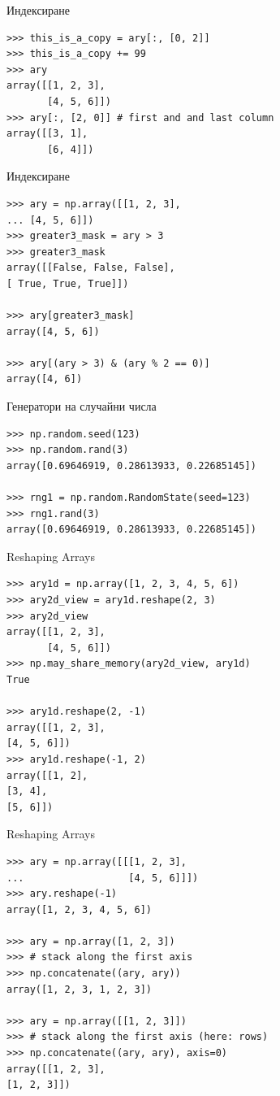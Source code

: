 \documentclass{beamer}
\begin{document}
\begin{frame}[fragile]{Индексиране }
\begin{verbatim}
>>> this_is_a_copy = ary[:, [0, 2]]
>>> this_is_a_copy += 99
>>> ary
array([[1, 2, 3],
       [4, 5, 6]])
>>> ary[:, [2, 0]] # first and and last column
array([[3, 1],
       [6, 4]])
\end{verbatim}
\end{frame}

\begin{frame}[fragile]{Индексиране }
\begin{verbatim}
>>> ary = np.array([[1, 2, 3],
... [4, 5, 6]])
>>> greater3_mask = ary > 3
>>> greater3_mask
array([[False, False, False],
[ True, True, True]])

>>> ary[greater3_mask]
array([4, 5, 6])

>>> ary[(ary > 3) & (ary % 2 == 0)]
array([4, 6])
\end{verbatim}
\end{frame}

\begin{frame}[fragile]{Генератори на случайни числа}
\begin{verbatim}
>>> np.random.seed(123)
>>> np.random.rand(3)
array([0.69646919, 0.28613933, 0.22685145])

>>> rng1 = np.random.RandomState(seed=123)
>>> rng1.rand(3)
array([0.69646919, 0.28613933, 0.22685145])
\end{verbatim}
\end{frame}

\begin{frame}[fragile]{Reshaping Arrays}
\begin{verbatim}
>>> ary1d = np.array([1, 2, 3, 4, 5, 6])
>>> ary2d_view = ary1d.reshape(2, 3)
>>> ary2d_view
array([[1, 2, 3],
       [4, 5, 6]])
>>> np.may_share_memory(ary2d_view, ary1d)
True

>>> ary1d.reshape(2, -1)
array([[1, 2, 3],
[4, 5, 6]])
>>> ary1d.reshape(-1, 2)
array([[1, 2],
[3, 4],
[5, 6]])
\end{verbatim}
\end{frame}

\begin{frame}[fragile]{Reshaping Arrays}
\begin{verbatim}
>>> ary = np.array([[[1, 2, 3],
...                  [4, 5, 6]]])
>>> ary.reshape(-1)
array([1, 2, 3, 4, 5, 6])

>>> ary = np.array([1, 2, 3])
>>> # stack along the first axis
>>> np.concatenate((ary, ary))
array([1, 2, 3, 1, 2, 3])

>>> ary = np.array([[1, 2, 3]])
>>> # stack along the first axis (here: rows)
>>> np.concatenate((ary, ary), axis=0)
array([[1, 2, 3],
[1, 2, 3]])
\end{verbatim}
\end{frame}
\end{document}
